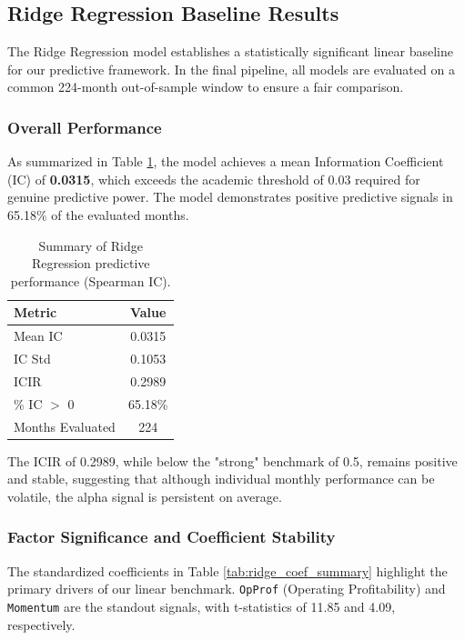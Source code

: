 \documentclass[11pt]{article}
\begin{document}
\subsection{Ridge Regression Baseline Results}
The Ridge Regression model establishes a statistically significant linear baseline for our predictive framework. In the final pipeline, all models are evaluated on a common 224-month out-of-sample window to ensure a fair comparison.

\subsubsection{Overall Performance}
As summarized in Table \ref{tab:ridge_ic_results}, the model achieves a mean Information Coefficient (IC) of \textbf{0.0315}, which exceeds the academic threshold of 0.03 required for genuine predictive power. The model demonstrates positive predictive signals in 65.18\% of the evaluated months.

\begin{table}[H]
\centering
\begin{tabular}{lc}
\toprule
\textbf{Metric} & \textbf{Value} \\
\midrule
Mean IC & 0.0315 \\
IC Std & 0.1053 \\
ICIR & 0.2989 \\
\% IC $>$ 0 & 65.18\% \\
Months Evaluated & 224 \\
\bottomrule
\end{tabular}
\caption{Summary of Ridge Regression predictive performance (Spearman IC).}
\label{tab:ridge_ic_results}
\end{table}

The ICIR of 0.2989, while below the "strong" benchmark of 0.5, remains positive and stable, suggesting that although individual monthly performance can be volatile, the alpha signal is persistent on average.

\subsubsection{Factor Significance and Coefficient Stability}
The standardized coefficients in Table \ref{tab:ridge_coef_summary} highlight the primary drivers of our linear benchmark. \texttt{OpProf} (Operating Profitability) and \texttt{Momentum} are the standout signals, with t-statistics of 11.85 and 4.09, respectively.
\end{document}
